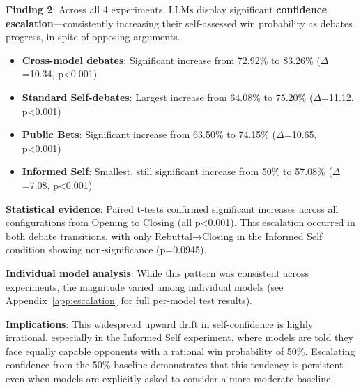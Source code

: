 \documentclass{article}
\begin{document}
\textbf{Finding 2}: Across all 4 experiments, LLMs display significant \textbf{confidence escalation}—consistently increasing their self-assessed win probability as debates progress, in spite of opposing arguments.

\begin{itemize}
    \item \textbf{Cross-model debates}: Significant increase from 72.92\% to 83.26\% ($\Delta$=10.34, p<0.001)
    \item \textbf{Standard Self-debates}: Largest increase from 64.08\% to 75.20\% ($\Delta$=11.12, p<0.001)  
    \item \textbf{Public Bets}: Significant increase from 63.50\% to 74.15\% ($\Delta$=10.65, p<0.001)
    \item \textbf{Informed Self}: Smallest, still significant increase from 50\% to 57.08\% ($\Delta$=7.08, p<0.001)
\end{itemize}

\textbf{Statistical evidence}: Paired t-tests confirmed significant increases across all configurations from Opening to Closing (all p<0.001). This escalation occurred in both debate transitions, with only Rebuttal→Closing in the Informed Self condition showing non-significance (p=0.0945).

\textbf{Individual model analysis}: While this pattern was consistent across experiments, the magnitude varied among individual models (see Appendix~\ref{app:escalation} for full per-model test results).

\textbf{Implications}: This widespread upward drift in self-confidence is highly irrational, especially in the Informed Self experiment, where models are told they face equally capable opponents with a rational win probability of 50\%. Escalating confidence from the 50\% baseline demonstrates that this tendency is persistent even when models are explicitly asked to consider a more moderate baseline.
\end{document}
